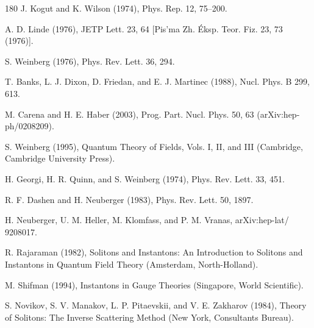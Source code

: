 \begin{thebibliography}{180}
 J. Kogut and K. Wilson (1974), Phys. Rep. 12, 75--200.

 A. D. Linde (1976), JETP Lett. 23, 64 [Pis'ma Zh. Éksp. Teor. Fiz. 23, 73 (1976)].

 S. Weinberg (1976), Phys. Rev. Lett. 36, 294.

 T. Banks, L. J. Dixon, D. Friedan, and E. J. Martinec (1988), Nucl. Phys. B 299, 613.

 M. Carena and H. E. Haber (2003), Prog. Part. Nucl. Phys. 50, 63 (arXiv:hep-ph/0208209).

 S. Weinberg (1995), Quantum Theory of Fields, Vols. I, II, and III (Cambridge, Cambridge University Press).

 H. Georgi, H. R. Quinn, and S. Weinberg (1974), Phys. Rev. Lett. 33, 451.

 R. F. Dashen and H. Neuberger (1983), Phys. Rev. Lett. 50, 1897.

 H. Neuberger, U. M. Heller, M. Klomfass, and P. M. Vranas, arXiv:hep-lat/ 9208017.

 R. Rajaraman (1982), Solitons and Instantons: An Introduction to Solitons and Instantons in Quantum Field Theory (Amsterdam, North-Holland).

 M. Shifman (1994), Instantons in Gauge Theories (Singapore, World Scientific).

 S. Novikov, S. V. Manakov, L. P. Pitaevskii, and V. E. Zakharov (1984), Theory of Solitons: The Inverse Scattering Method (New York, Consultants Bureau).


\end{thebibliography}
